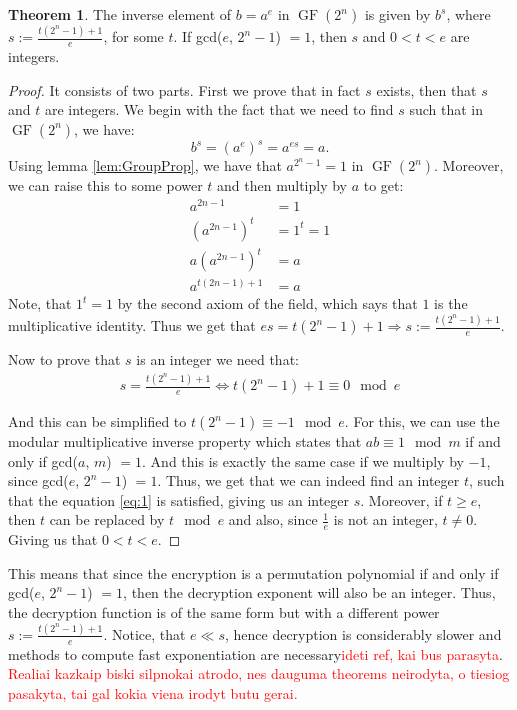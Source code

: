 \documentclass{Resources/UoBLab1}
\theoremstyle{definition}
\newtheorem{theorem}{Theorem}[section]
\begin{document}
\begin{theorem}
    The inverse element of $b = a^e$ in $\operatorname{GF}(2^n)$ is given by $b^s$, where $s := \frac{t(2^n-1) + 1}{e}$, for some $t$. If gcd($e$, $2^n-1$) $= 1$, then $s$ and $0 < t < e$ are integers.
\end{theorem}
\begin{proof}
    It consists of two parts. First we prove that in fact $s$ exists, then that $s$ and $t$ are integers. We begin with the fact that we need to find $s$ such that in $\operatorname{GF}(2^n)$, we have:
    \[
        b^s = (a^e)^s = a^{es} = a.
    \]
    Using lemma \ref{lem:GroupProp}, we have that $a^{2^n-1} = 1$ in $\operatorname{GF}(2^n)$. Moreover, we can raise this to some power $t$ and then multiply by $a$ to get:
    \begin{align*}
        a^{2n-1} &= 1\\
        (a^{2n-1}) ^ t &= 1^t = 1\\
        a (a^{2n-1})^t &= a\\
        a^{t(2n-1)+1} &= a
    \end{align*}
    Note, that $1^t=1$ by the second axiom of the field, which says that $1$ is the multiplicative identity. Thus we get that \(es = t(2^n-1)+1 \Rightarrow s := \frac{t(2^n-1)+1}{e}\).\medskip

    \noindent Now to prove that $s$ is an integer we need that:
    \begin{equation}
        \begin{array}{c}
            s = \frac{t(2^n-1) + 1}{e} \iff t(2^n-1) + 1 \equiv 0 \mod e
        \end{array}\label{eq:1}
    \end{equation}

    \noindent And this can be simplified to \(t(2^n-1) \equiv -1 \mod e\). For this, we can use the modular multiplicative inverse property which states that $ab \equiv 1 \mod m$ if and only if gcd($a$, $m$) $= 1$. And this is exactly the same case if we multiply by $-1$, since gcd($e$, $2^n-1$) $= 1$. Thus, we get that we can indeed find an integer $t$, such that the equation \eqref{eq:1} is satisfied, giving us an integer $s$. Moreover, if $t \ge e$, then $t$ can be replaced by $t \mod e$ and also, since $\frac{1}{e}$ is not an integer, $t \ne 0$. Giving us that $0 < t < e$.
\end{proof}
This means that since the encryption is a permutation polynomial if and only if gcd($e$, $2^n-1$) $= 1$, then the decryption exponent will also be an integer. Thus, the decryption function is of the same form but with a different power $s := \frac{t(2^n-1)+1}{e}$. Notice, that $e \ll s$, hence decryption is considerably slower and methods to compute fast exponentiation are necessary\textcolor{red}{ideti ref, kai bus parasyta}.
\textcolor{red}{Realiai kazkaip biski silpnokai atrodo, nes dauguma theorems neirodyta, o tiesiog pasakyta, tai gal kokia viena irodyt butu gerai.}
\end{document}
